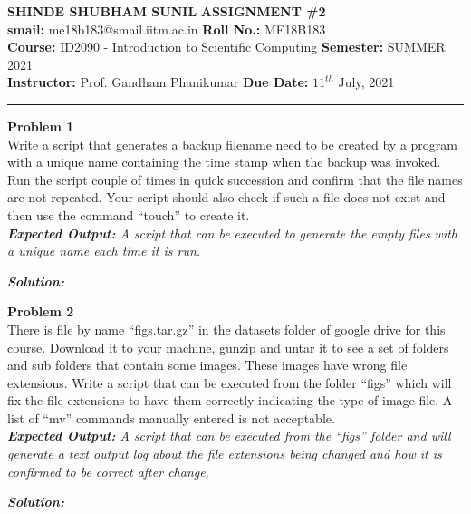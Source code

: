 \documentclass[a4paper, 11pt]{article}
\newenvironment{problem}[2][Problem]
    { \begin{mdframed}[backgroundcolor=gray!20] \textbf{#1 #2} \\}
    {  \end{mdframed}}
\newenvironment{solution}
    {\textbf{\textit{Solution:}}}
    {}
\begin{document}
\noindent
\large\textbf{SHINDE SHUBHAM SUNIL} \hfill \textbf{ASSIGNMENT \#2}   \\
\textbf{smail:} me18b183@smail.iitm.ac.in \hfill \textbf{Roll No.:} ME18B183 \\
\normalsize\textbf {Course:} ID2090 - Introduction to Scientific Computing \hfill \textbf{Semester:} SUMMER 2021 \\
\textbf{Instructor:} Prof. Gandham Phanikumar \hfill \textbf{Due Date:} $11^{th}$ July, 2021 \\
\noindent\rule{7in}{2.5pt}
\begin{problem}{1}
Write a script that generates a backup filename need to be created by a program with a unique name containing the time stamp when the backup was invoked. Run the script couple of times in quick succession and confirm that the file names are not repeated. Your script should also check if such a file does not exist and then use the command “touch” to create it. 
\\ \textit{\textbf{Expected Output:} A script that can be executed to generate the empty files with a unique name each time it is run.}
\end{problem}
\begin{solution}


\end{solution} 


\begin{problem}{2}
There is file by name “figs.tar.gz” in the datasets folder of google drive for this course. Download it to your machine, gunzip and untar it to see a set of folders and sub folders that contain some images. These images have wrong file extensions. Write a script that can be executed from the folder “figs” which will fix the file extensions to have them correctly indicating the type of image file. A list of “mv” commands manually entered is not acceptable.
\\ \textit{\textbf{Expected Output:} A script that can be executed from the “figs” folder and will generate a text output log about the file extensions being changed and how it is confirmed to be correct after change.}
\end{problem}
\begin{solution}


\end{solution} 
\end{document}
